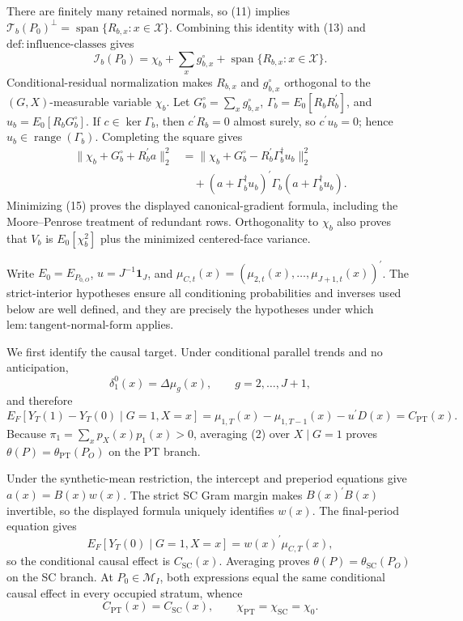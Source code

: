 There are finitely many retained normals, so (11) implies \(\mathcal T_b(P_0)^{\perp}=\operatorname{span}\{R_{b,x}:x\in\mathcal X\}\).  Combining this identity with (13) and \(\mathrm{def{:}influence\text{-}classes}\) gives
\[
 \mathcal I_b(P_0)=\chi_b+\sum_xg^{\circ}_{b,x}
 +\operatorname{span}\{R_{b,x}:x\in\mathcal X\}.
 \tag{14}
\]
Conditional-residual normalization makes \(R_{b,x}\) and \(g^{\circ}_{b,x}\) orthogonal to the \((G,X)\)-measurable variable \(\chi_b\).  Let \(G_b^{\circ}=\sum_xg^{\circ}_{b,x}\), \(\Gamma_b=E_0[R_bR_b^{\prime}]\), and \(u_b=E_0[R_bG_b^{\circ}]\).  If \(c\in\ker\Gamma_b\), then \(c^{\prime}R_b=0\) almost surely, so \(c^{\prime}u_b=0\); hence \(u_b\in\operatorname{range}(\Gamma_b)\).  Completing the square gives
\[
 \begin{aligned}
 \|\chi_b+G_b^{\circ}+R_b^{\prime}a\|_2^2
 &=\|\chi_b+G_b^{\circ}-R_b^{\prime}\Gamma_b^{\dagger}u_b\|_2^2\\
 &\quad +(a+\Gamma_b^{\dagger}u_b)^{\prime}
 \Gamma_b(a+\Gamma_b^{\dagger}u_b).
 \end{aligned}
 \tag{15}
\]
Minimizing (15) proves the displayed canonical-gradient formula, including the Moore--Penrose treatment of redundant rows.  Orthogonality to \(\chi_b\) also proves that \(V_b\) is \(E_0[\chi_b^2]\) plus the minimized centered-face variance.

Write \(E_0=E_{P_{0,O}}\), \(u=J^{-1}\mathbf 1_J\), and \(\mu_{C,t}(x)=(\mu_{2,t}(x),\ldots,\mu_{J+1,t}(x))^{\prime}\).  The strict-interior hypotheses ensure all conditioning probabilities and inverses used below are well defined, and they are precisely the hypotheses under which \(\mathrm{lem{:}tangent\text{-}normal\text{-}form}\) applies.

We first identify the causal target.  Under conditional parallel trends and no anticipation,
\[
 \delta_1^0(x)=\Delta\mu_g(x),
 \qquad g=2,\ldots,J+1,
 \tag{1}
\]
and therefore
\[
 E_F[Y_T(1)-Y_T(0)\mid G=1,X=x]
 =\mu_{1,T}(x)-\mu_{1,T-1}(x)-u^{\prime}D(x)
 =C_{\mathrm{PT}}(x).
 \tag{2}
\]
Because \(\pi_1=\sum_xp_X(x)p_1(x)>0\), averaging (2) over \(X\mid G=1\) proves \(\theta(P)=\theta_{\mathrm{PT}}(P_O)\) on the PT branch.

Under the synthetic-mean restriction, the intercept and preperiod equations give \(a(x)=B(x)w(x)\).  The strict SC Gram margin makes \(B(x)^{\prime}B(x)\) invertible, so the displayed formula uniquely identifies \(w(x)\).  The final-period equation gives
\[
 E_F[Y_T(0)\mid G=1,X=x]=w(x)^{\prime}\mu_{C,T}(x),
 \tag{3}
\]
so the conditional causal effect is \(C_{\mathrm{SC}}(x)\).  Averaging proves \(\theta(P)=\theta_{\mathrm{SC}}(P_O)\) on the SC branch.  At \(P_0\in\mathcal M_I\), both expressions equal the same conditional causal effect in every occupied stratum, whence
\[
 C_{\mathrm{PT}}(x)=C_{\mathrm{SC}}(x),
 \qquad
 \chi_{\mathrm{PT}}=\chi_{\mathrm{SC}}=\chi_0.
 \tag{4}
\]

